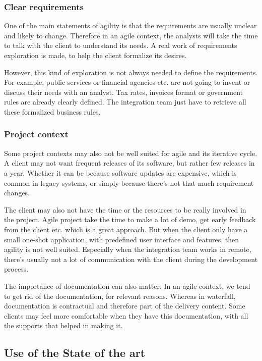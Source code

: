 \subsubsection{Clear requirements}
One of the main statements of agility is that the requirements are usually
unclear and likely to change.
Therefore in an agile context, the analysts will take the time to talk with
the client to understand its needs.
A real work of requirements exploration is made, to help the client
formalize its desires.

However, this kind of exploration is not always needed to define the
requirements.
For example, public services or financial agencies etc.
are not going to invent or discuss their needs with an analyst.
Tax rates, invoices format or government rules are already clearly defined.
The integration team just have to retrieve all these formalized business rules.

\subsubsection{Project context}
Some project contexts may also not be well suited for agile and its iterative
cycle.
A client may not want frequent releases of its software, but rather few
releases in a year.
Whether it can be because software updates are expensive, which is common in
legacy systems, or simply because there's not that much requirement changes.

The client may also not have the time or the resources to be really involved
in the project.
Agile project take the time to make a lot of demo, get early feedback from
the client etc.
which is a great approach.
But when the client only have a small one-shot application, with predefined
user interface and features, then agility is not well suited.
Especially when the integration team works in remote, there's usually not a
lot of communication with the client during the development process.

The importance of documentation can also matter.
In an agile context, we tend to get rid of the documentation, for relevant
reasons.
Whereas in waterfall, documentation is contractual and therefore part of the
delivery content.
Some clients may feel more comfortable when they have this documentation,
with all the supports that helped in making it.

\subsection{Use of the State of the art}\label{subsec:use-of-the-state-of-the-art}

